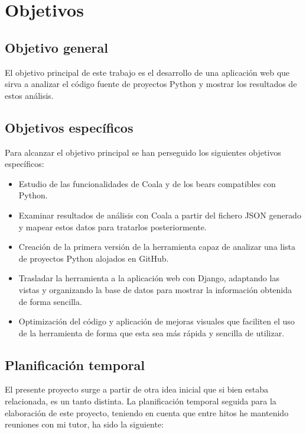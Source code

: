 \documentclass[a4paper, 12pt]{book}
\begin{document}

\cleardoublepage
\chapter{Objetivos}
\label{chap:objetivos}

\section{Objetivo general}
\label{sec:objetivo-general}
El objetivo principal de este trabajo es el desarrollo de una aplicación web que sirva a analizar el código fuente de proyectos Python y mostrar los resultados de estos análisis.

\section{Objetivos específicos}
\label{sec:objetivos-especificos}
Para alcanzar el objetivo principal se han perseguido los siguientes objetivos específicos:
\begin{itemize}
  \item Estudio de las funcionalidades de Coala y de los bears compatibles con Python.
  \item Examinar resultados de análisis con Coala a partir del fichero JSON generado y mapear estos datos para tratarlos posteriormente.
  \item Creación de la primera versión de la herramienta capaz de analizar una lista de proyectos Python alojados en GitHub.
  \item Trasladar la herramienta a la aplicación web con Django, adaptando las vistas y organizando la base de datos para mostrar la información obtenida de forma sencilla.
  \item Optimización del código y aplicación de mejoras visuales que faciliten el uso de la herramienta de forma que esta sea más rápida y sencilla de utilizar.
\end{itemize}


\section{Planificación temporal}
\label{sec:planificacion-temporal}
El presente proyecto surge a partir de otra idea inicial que si bien estaba relacionada, es un tanto distinta. La planificación temporal seguida para la elaboración de este proyecto, teniendo en cuenta que entre hitos he mantenido reuniones con mi tutor, ha sido la siguiente:
\end{document}
